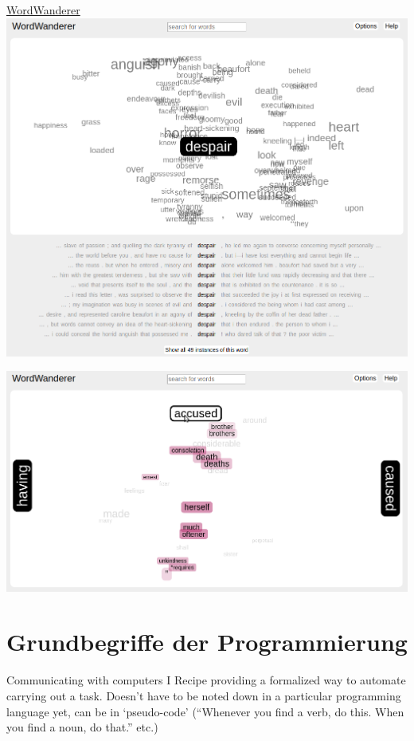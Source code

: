 \documentclass[10pt,a4paper]{article}
\begin{document}
\begin{multicols}{3}
\begin{textbox}{\href{http://wordwanderer.org/}{WordWanderer}}
\includegraphics[width=\textwidth]{wordwanderer2.png}

\includegraphics[width=\textwidth]{wordwanderer3.png}
\end{textbox}




\section{Grundbegriffe der Programmierung}

\begin{textbox}{Communicating with computers I}
 Recipe providing a formalized way to automate carrying out a task. Doesn't have to be noted down in a particular programming language yet, can be in `pseudo-code' (``Whenever you find a verb, do this. When you find a noun, do that.'' etc.)


\end{textbox}
\end{multicols}
\end{document}
